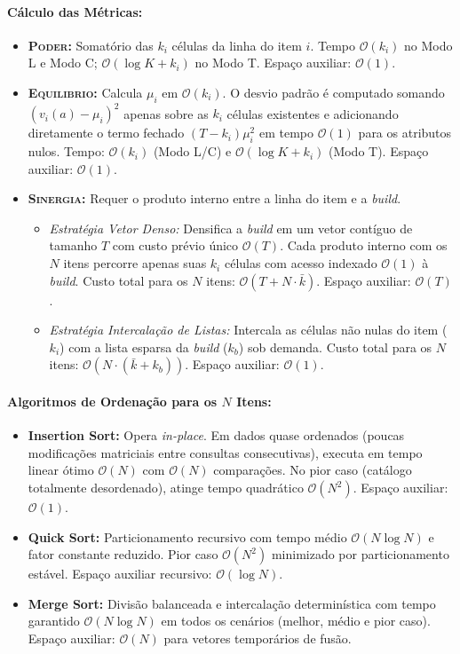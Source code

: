 \documentclass[letterpaper]{article}
\begin{document}
\paragraph{Cálculo das Métricas:}
\begin{itemize}
    \item \textbf{\textsc{Poder}:} Somatório das $k_i$ células da linha do item $i$. Tempo $\mathcal{O}(k_i)$ no Modo L e Modo C; $\mathcal{O}(\log K + k_i)$ no Modo T. Espaço auxiliar: $\mathcal{O}(1)$.
    \item \textbf{\textsc{Equilibrio}:} Calcula $\mu_i$ em $\mathcal{O}(k_i)$. O desvio padrão é computado somando $(v_i(a) - \mu_i)^2$ apenas sobre as $k_i$ células existentes e adicionando diretamente o termo fechado $(T - k_i)\mu_i^2$ em tempo $\mathcal{O}(1)$ para os atributos nulos. Tempo: $\mathcal{O}(k_i)$ (Modo L/C) e $\mathcal{O}(\log K + k_i)$ (Modo T). Espaço auxiliar: $\mathcal{O}(1)$.
    \item \textbf{\textsc{Sinergia}:} Requer o produto interno entre a linha do item e a \textit{build}.
    \begin{itemize}
        \item \textit{Estratégia Vetor Denso:} Densifica a \textit{build} em um vetor contíguo de tamanho $T$ com custo prévio único $\mathcal{O}(T)$. Cada produto interno com os $N$ itens percorre apenas suas $k_i$ células com acesso indexado $\mathcal{O}(1)$ à \textit{build}. Custo total para os $N$ itens: $\mathcal{O}(T + N \cdot \bar{k})$. Espaço auxiliar: $\mathcal{O}(T)$.
        \item \textit{Estratégia Intercalação de Listas:} Intercala as células não nulas do item ($k_i$) com a lista esparsa da \textit{build} ($k_b$) sob demanda. Custo total para os $N$ itens: $\mathcal{O}(N \cdot (\bar{k} + k_b))$. Espaço auxiliar: $\mathcal{O}(1)$.
    \end{itemize}
\end{itemize}

\paragraph{Algoritmos de Ordenação para os $N$ Itens:}
\begin{itemize}
    \item \textbf{Insertion Sort:} Opera \textit{in-place}. Em dados quase ordenados (poucas modificações matriciais entre consultas consecutivas), executa em tempo linear ótimo $\mathcal{O}(N)$ com $\mathcal{O}(N)$ comparações. No pior caso (catálogo totalmente desordenado), atinge tempo quadrático $\mathcal{O}(N^2)$. Espaço auxiliar: $\mathcal{O}(1)$.
    \item \textbf{Quick Sort:} Particionamento recursivo com tempo médio $\mathcal{O}(N \log N)$ e fator constante reduzido. Pior caso $\mathcal{O}(N^2)$ minimizado por particionamento estável. Espaço auxiliar recursivo: $\mathcal{O}(\log N)$.
    \item \textbf{Merge Sort:} Divisão balanceada e intercalação determinística com tempo garantido $\mathcal{O}(N \log N)$ em todos os cenários (melhor, médio e pior caso). Espaço auxiliar: $\mathcal{O}(N)$ para vetores temporários de fusão.
\end{itemize}
\end{document}
